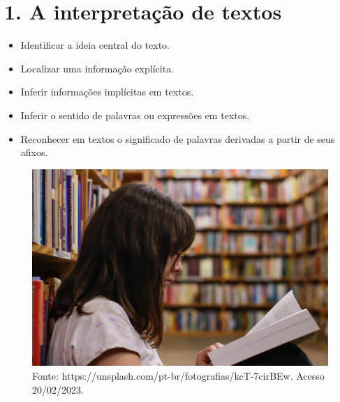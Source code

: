 \chapter{1. A interpretação de textos}



\begin{itemize}
\item Identificar a ideia central do texto.

\item Localizar uma informação explícita.

\item Inferir informações implícitas em textos.

\item Inferir o sentido de palavras ou expressões em textos.

\item Reconhecer em textos o significado de palavras derivadas a partir de
seus afixos.
\end{itemize}

\begin{figure}[htpb!]
\includegraphics[width=.5\textwidth]{./imgs/img1.jpg}
\caption{Fonte: https://unsplash.com/pt-br/fotografias/kcT-7cirBEw. Acesso 20/02/2023.}
\end{figure}

